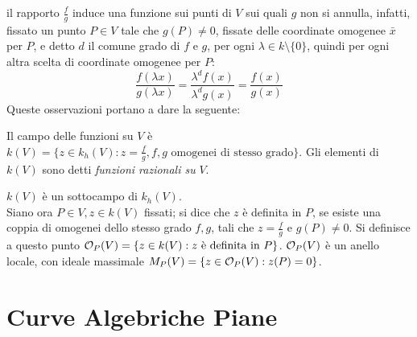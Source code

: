         il rapporto $\frac{f}{g}$ induce una funzione sui punti di $V$ sui quali $g$ non si annulla, infatti, fissato un punto $P \in V$ tale che $g(P) \neq 0$, fissate delle coordinate 
        omogenee $\bar{x}$ per $P$, e detto $d$ il comune grado di $f$ e $g$, per ogni $\lambda \in k \setminus \{0\}$, quindi per ogni altra scelta di coordinate omogenee per $P$:
        \begin{equation*}
            \frac{f(\lambda x)}{g(\lambda x)} = \frac{\lambda^d f(x)}{\lambda^d g(x)} = \frac{f(x)}{g(x)}
        \end{equation*}
        Queste osservazioni portano a dare la seguente: \begin{definizione}
            Il campo delle funzioni su $V$ è $k(V) = \{z \in k_h(V) : z = \frac{f}{g}, f,g \text{ omogenei di stesso grado}\}$. Gli elementi di $k(V)$ sono detti \emph{funzioni 
            razionali su} $V$.
        \end{definizione}
        $k(V)$ è un sottocampo di $k_h(V)$. \\
        Siano ora $P \in V, z \in k(V)$ fissati; si dice che $z$ è definita in $P$, se esiste una coppia di omogenei dello stesso grado $f,g$, tali che $z = \frac{f}{g}$ e $g(P) 
        \neq 0$. Si definisce a questo punto $\mathcal{O}_P(V) = \{z \in k(V) : z \text{ è definita in } P\}$. $\mathcal{O}_P(V)$ è un anello locale, con ideale massimale $M_P(V) = \{
        z \in \mathcal{O}_P(V) : z(P) = 0\}$.\\
        \begin{comment}
        Considero ora brevemente il caso di un multispazio, ovvero uno spazio del tipo $\P^{n_1} \times \cdots \times \P^{n_r} = X$, per opportuni $n_1,\ldots,n_r \in \N$.
        \begin{definizione}
            Un polinomio $F \in k[X_{1,1},\ldots,X_{n_1,1},\ldots,X_{1,r},\ldots,X_{n_r,r}] = Y$ si dice omogeneo se è omogeneo rispetto ad ogni famiglia di indeterminate.\\
            Un insieme algebrico in $X$ è $V(S)$, per un opportuno $S \subseteq Y$.
        \end{definizione}
        Valgono risultati e definizioni analoghi a quelli visti nel caso di insiemi affini e proiettivi.
    \end{comment}

    \newpage
    \section{Curve Algebriche Piane} \label{par:plane-curves}
